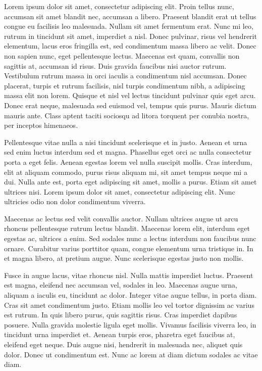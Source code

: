 
Lorem ipsum dolor sit amet, consectetur adipiscing elit. Proin tellus nunc, accumsan sit amet blandit nec, accumsan a libero. Praesent blandit erat ut tellus congue eu facilisis leo malesuada. Nullam sit amet fermentum erat. Nunc mi leo, rutrum in tincidunt sit amet, imperdiet a nisl. Donec pulvinar, risus vel hendrerit elementum, lacus eros fringilla est, sed condimentum massa libero ac velit. Donec non sapien nunc, eget pellentesque lectus. Maecenas est quam, convallis non sagittis at, accumsan id risus. Duis gravida faucibus nisi auctor rutrum. Vestibulum rutrum massa in orci iaculis a condimentum nisl accumsan. Donec placerat, turpis et rutrum facilisis, nisl turpis condimentum nibh, a adipiscing massa elit non lorem. Quisque et nisl vel lectus tincidunt pulvinar quis eget arcu. Donec erat neque, malesuada sed euismod vel, tempus quis purus. Mauris dictum mauris ante. Class aptent taciti sociosqu ad litora torquent per conubia nostra, per inceptos himenaeos.

Pellentesque vitae nulla a nisi tincidunt scelerisque et in justo. Aenean et urna sed enim luctus interdum sed et magna. Phasellus eget orci ac nulla consectetur porta a eget felis. Aenean egestas lorem vel nulla suscipit mollis. Cras interdum, elit at aliquam commodo, purus risus aliquam mi, sit amet tempus neque mi a dui. Nulla ante est, porta eget adipiscing sit amet, mollis a purus. Etiam sit amet ultrices nisi. Lorem ipsum dolor sit amet, consectetur adipiscing elit. Nunc ultricies odio non dolor condimentum viverra.

Maecenas ac lectus sed velit convallis auctor. Nullam ultrices augue ut arcu rhoncus pellentesque rutrum lectus blandit. Maecenas lorem elit, interdum eget egestas ac, ultrices a enim. Sed sodales nunc a lectus interdum non faucibus nunc ornare. Curabitur varius porttitor quam, congue elementum urna tristique in. In et magna libero, at pretium augue. Nunc scelerisque egestas justo non mollis.

Fusce in augue lacus, vitae rhoncus nisl. Nulla mattis imperdiet luctus. Praesent est magna, eleifend nec accumsan vel, sodales in leo. Maecenas augue urna, aliquam a iaculis eu, tincidunt ac dolor. Integer vitae augue tellus, in porta diam. Cras sit amet condimentum justo. Etiam mollis leo vel tortor dignissim ac varius est rutrum. In quis libero purus, quis sagittis risus. Cras imperdiet dapibus posuere. Nulla gravida molestie ligula eget mollis. Vivamus facilisis viverra leo, in tincidunt urna imperdiet et. Aenean turpis eros, pharetra eget faucibus at, eleifend eget neque. Duis augue nisi, hendrerit in malesuada nec, aliquet quis dolor. Donec ut condimentum est. Nunc ac lorem at diam dictum sodales ac vitae diam.

